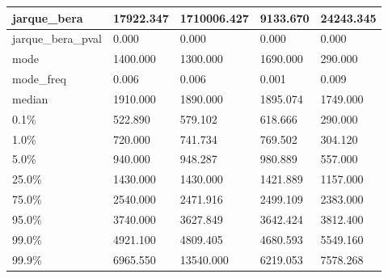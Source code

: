 \begin{table}[H]
\begin{tabular}{|l|m{10em}|m{10em}|m{10em}|m{10em}|}
\hline jarque\_bera & 17922.347 & 1710006.427 & 9133.670 & 24243.345 \\
\hline jarque\_bera\_pval & 0.000 & 0.000 & 0.000 & 0.000 \\
\hline mode & 1400.000 & 1300.000 & 1690.000 & 290.000 \\
\hline mode\_freq & 0.006 & 0.006 & 0.001 & 0.009 \\
\hline median & 1910.000 & 1890.000 & 1895.074 & 1749.000 \\
\hline 0.1\% & 522.890 & 579.102 & 618.666 & 290.000 \\
\hline 1.0\% & 720.000 & 741.734 & 769.502 & 304.120 \\
\hline 5.0\% & 940.000 & 948.287 & 980.889 & 557.000 \\
\hline 25.0\% & 1430.000 & 1430.000 & 1421.889 & 1157.000 \\
\hline 75.0\% & 2540.000 & 2471.916 & 2499.109 & 2383.000 \\
\hline 95.0\% & 3740.000 & 3627.849 & 3642.424 & 3812.400 \\
\hline 99.0\% & 4921.100 & 4809.405 & 4680.593 & 5549.160 \\
\hline 99.9\% & 6965.550 & 13540.000 & 6219.053 & 7578.268 \\
\hline
\end{tabular}
\end{table}
